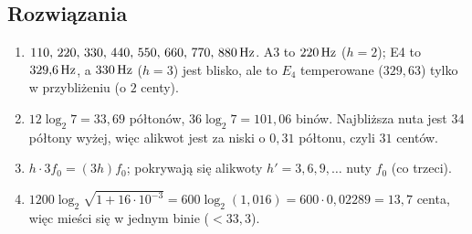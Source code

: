 \subsection*{Rozwiązania}
\begin{enumerate}
\item $110,\,220,\,330,\,440,\,550,\,660,\,770,\,880\,\mathrm{Hz}$. A3 to $220\,\mathrm{Hz}$ ($h=2$); E4 to $329{,}6\,\mathrm{Hz}$, a $330\,\mathrm{Hz}$ ($h=3$) jest blisko, ale to $E_4$ temperowane ($329{,}63$) tylko w przybliżeniu (o $2$ centy).
\item $12\log_2 7=33{,}69$ półtonów, $36\log_2 7=101{,}06$ binów. Najbliższa nuta jest $34$ półtony wyżej, więc alikwot jest za niski o $0{,}31$ półtonu, czyli $31$ centów.
\item $h\cdot3f_0=(3h)f_0$; pokrywają się alikwoty $h'=3,6,9,\dots$ nuty $f_0$ (co trzeci).
\item $1200\log_2\sqrt{1+16\cdot10^{-3}}=600\log_2(1{,}016)=600\cdot0{,}02289=13{,}7$ centa, więc mieści się w jednym binie ($<33{,}3$).
\end{enumerate}
